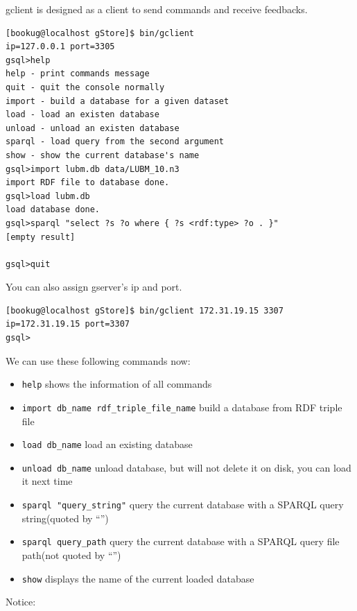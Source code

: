 \documentclass[titlepage, a4paper, 12pt]{article}
\begin{document}

gclient is designed as a client to send commands and receive feedbacks.

\begin{verbatim}
[bookug@localhost gStore]$ bin/gclient
ip=127.0.0.1 port=3305
gsql>help
help - print commands message
quit - quit the console normally
import - build a database for a given dataset
load - load an existen database
unload - unload an existen database
sparql - load query from the second argument
show - show the current database's name
gsql>import lubm.db data/LUBM_10.n3
import RDF file to database done.
gsql>load lubm.db
load database done.
gsql>sparql "select ?s ?o where { ?s <rdf:type> ?o . }"
[empty result]

gsql>quit
\end{verbatim}

You can also assign gserver's ip and port.

\begin{verbatim}
[bookug@localhost gStore]$ bin/gclient 172.31.19.15 3307
ip=172.31.19.15 port=3307
gsql>
\end{verbatim}

We can use these following commands now:

\begin{itemize}
\item
  \texttt{help} shows the information of all commands
\item
  \texttt{import\ db\_name\ rdf\_triple\_file\_name} build a database
  from RDF triple file
\item
  \texttt{load\ db\_name} load an existing database
\item
  \texttt{unload\ db\_name} unload database, but will not delete it on
  disk, you can load it next time
\item
  \texttt{sparql\ "query\_string"} query the current database with a
  SPARQL query string(quoted by ``'')
\item
\texttt{sparql\ query\_path} query the current database with a
SPARQL query file path(not quoted by ``'')
\item
  \texttt{show} displays the name of the current loaded database
\end{itemize}

Notice:
\end{document}
